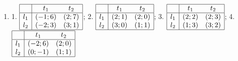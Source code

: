 \begin{problem}
\begin{enumerate}
\item 	1.  $\begin{array}{|c|cc|}  \hline {} & {t_{1} } & {t_{2} } \\  \hline {l_{1} } & {\left(-1;6\right)} & {\left(2;7\right)} \\ {l_{2} } & {\left(-2;3\right)} & {\left(3;1\right)} \\  \hline  \end{array}$; 2.  $\begin{array}{|c|cc|}  \hline {} & {t_{1} } & {t_{2} } \\  \hline {l_{1} } & {\left(2;1\right)} & {\left(2;0\right)} \\ {l_{2} } & {\left(3;0\right)} & {\left(1;1\right)} \\  \hline  \end{array}$; 3.  $\begin{array}{|c|cc|}  \hline {} & {t_{1} } & {t_{2} } \\  \hline {l_{1} } & {\left(2;2\right)} & {\left(2;3\right)} \\ {l_{2} } & {\left(1;3\right)} & {\left(3;2\right)} \\  \hline  \end{array}$; 4.  $\begin{array}{|c|cc|}  \hline {} & {t_{1} } & {t_{2} } \\  \hline {l_{1} } & {\left(-2;6\right)} & {\left(2;0\right)} \\ {l_{2} } & {\left(0;-1\right)} & {\left(1;1\right)} \\  \hline  \end{array}$ \\

\end{enumerate}
\end{problem}
